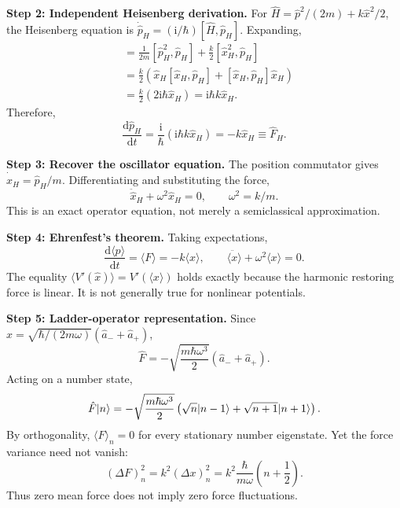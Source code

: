 \documentclass[11pt,a4paper]{article}
\newcommand{\dd}{\mathrm{d}}\newcommand{\iu}{\mathrm{i}}\newcommand{\ee}{\mathrm{e}}
\newcommand{\avg}[1]{\langle #1\rangle}\newcommand{\Sch}{Schr\"odinger}
\begin{document}
\textbf{Step 2: Independent Heisenberg derivation.} For
\(\hat H=\hat p^2/(2m)+k\hat x^2/2\), the Heisenberg equation is \(\dot{\hat p}_H=(\iu/\hbar)[\hat H,\hat p_H]\). Expanding,
\begin{align}
[\hat H,\hat p_H]&=\frac1{2m}[\hat p_H^2,\hat p_H]+\frac{k}{2}[\hat x_H^2,\hat p_H]\\
&=\frac{k}{2}\left(\hat x_H[\hat x_H,\hat p_H]+[\hat x_H,\hat p_H]\hat x_H\right)\\
&=\frac{k}{2}(2\iu\hbar\hat x_H)=\iu\hbar k\hat x_H.
\end{align}
Therefore,
\begin{equation}\boxed{\frac{\dd\hat p_H}{\dd t}=\frac{\iu}{\hbar}(\iu\hbar k\hat x_H)=-k\hat x_H\equiv\hat F_H.}\end{equation}

\textbf{Step 3: Recover the oscillator equation.} The position commutator gives \(\dot{\hat x}_H=\hat p_H/m\). Differentiating and substituting the force,
\begin{equation}\boxed{\ddot{\hat x}_H+\omega^2\hat x_H=0,\qquad\omega^2=k/m.}\end{equation}
This is an exact operator equation, not merely a semiclassical approximation.

\textbf{Step 4: Ehrenfest's theorem.} Taking expectations,
\begin{equation}\boxed{\frac{\dd\avg p}{\dd t}=\avg F=-k\avg x,\qquad\ddot{\avg x}+\omega^2\avg x=0.}\end{equation}
The equality \(\avg{V'(\hat x)}=V'(\avg x)\) holds exactly because the harmonic restoring force is linear. It is not generally true for nonlinear potentials.

\textbf{Step 5: Ladder-operator representation.} Since \(\hat x=\sqrt{\hbar/(2m\omega)}(\hat a_-+\hat a_+)\),
\begin{equation}\boxed{\hat F=-\sqrt{\frac{m\hbar\omega^3}{2}}(\hat a_-+\hat a_+).}\end{equation}
Acting on a number state,
\begin{equation}\hat F|n\rangle=-\sqrt{\frac{m\hbar\omega^3}{2}}\left(\sqrt n|n-1\rangle+\sqrt{n+1}|n+1\rangle\right).\end{equation}
By orthogonality, \(\avg F_n=0\) for every stationary number eigenstate. Yet the force variance need not vanish:
\begin{equation}(\Delta F)_n^2=k^2(\Delta x)_n^2=k^2\frac{\hbar}{m\omega}\left(n+\frac12\right).\end{equation}
Thus zero mean force does not imply zero force fluctuations.
\end{document}
